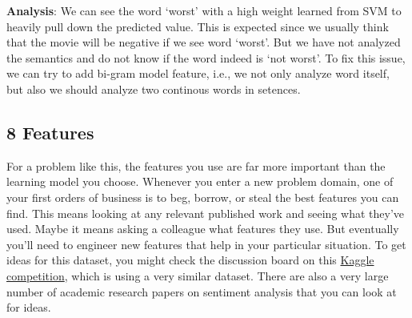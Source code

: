 \documentclass[11pt]{article}
\begin{document}
    \textbf{Analysis}: We can see the word `worst' with a high weight
learned from SVM to heavily pull down the predicted value. This is
expected since we usually think that the movie will be negative if we
see word `worst'. But we have not analyzed the semantics and do not know
if the word indeed is `not worst'. To fix this issue, we can try to add
bi-gram model feature, i.e., we not only analyze word itself, but also
we should analyze two continous words in setences.

    \hypertarget{features}{%
\subsection{8 Features}\label{features}}

For a problem like this, the features you use are far more important
than the learning model you choose. Whenever you enter a new problem
domain, one of your first orders of business is to beg, borrow, or steal
the best features you can find. This means looking at any relevant
published work and seeing what they've used. Maybe it means asking a
colleague what features they use. But eventually you'll need to engineer
new features that help in your particular situation. To get ideas for
this dataset, you might check the discussion board on this
\href{https://www.kaggle.com/c/sentiment-analysis-on-movie-reviews}{Kaggle
competition}, which is using a very similar dataset. There are also a
very large number of academic research papers on sentiment analysis that
you can look at for ideas.


    
    
    
    
\end{document}
